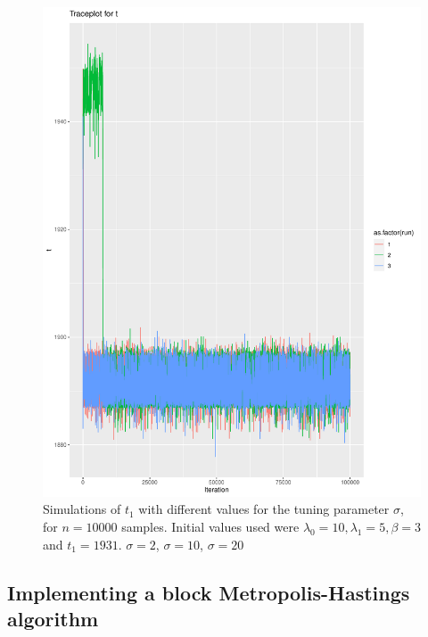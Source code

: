 \begin{figure}[H]
    \centering
    \includegraphics[width = \textwidth]{Images/tuning_t_nice.pdf}
    \caption{Simulations of $t_1$ with different values for the tuning parameter $\sigma$, for $n = 10000$ samples. Initial values used were $\lambda_0 = 10, \lambda_1 = 5, \beta = 3$ and $t_1 = 1931$. $\sigma = 2$,  $\sigma= 10$,  $\sigma= 20$}
    \label{fig:tuning_t_single_2}
\end{figure}



\subsection{Implementing a block Metropolis-Hastings algorithm}

